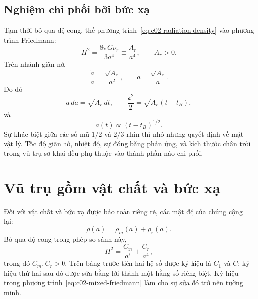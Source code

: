 \begin{classroomqa}
\end{classroomqa}

\subsection{Nghiệm chi phối bởi bức xạ}

Tạm thời bỏ qua độ cong, thế phương trình~\eqref{eq:c02-radiation-density} vào phương trình Friedmann:
\begin{equation}
H^2=\frac{8\pi G\nu_r}{3a^4}
\equiv\frac{A_r}{a^4},
\qquad A_r>0.
\label{eq:c02-radiation-friedmann}
\end{equation}
Trên nhánh giãn nở,
\begin{equation}
\frac{\dot a}{a}=\frac{\sqrt{A_r}}{a^2},
\qquad
\dot a=\frac{\sqrt{A_r}}{a}.
\end{equation}
Do đó
\begin{equation}
a\,da=\sqrt{A_r}\,dt,
\qquad
\frac{a^2}{2}=\sqrt{A_r}(t-t_B),
\end{equation}
và
\begin{equation}
\boxed{a(t)\propto(t-t_B)^{1/2}.}
\label{eq:c02-radiation-law}
\end{equation}
Sự khác biệt giữa các số mũ \(1/2\) và \(2/3\) nhìn thì nhỏ nhưng quyết định về mặt vật lý. Tốc độ giãn nở, nhiệt độ, sự đóng băng phản ứng, và kích thước chân trời trong vũ trụ sơ khai đều phụ thuộc vào thành phần nào chi phối.

\section{Vũ trụ gồm vật chất và bức xạ}

Đối với vật chất và bức xạ được bảo toàn riêng rẽ, các mật độ của chúng cộng lại:
\begin{equation}
\rho(a)=\rho_m(a)+\rho_r(a).
\end{equation}
Bỏ qua độ cong trong phép so sánh này,
\begin{equation}
\boxed{H^2=\frac{C_m}{a^3}+\frac{C_r}{a^4},}
\label{eq:c02-mixed-friedmann}
\end{equation}
trong đó \(C_m,C_r>0\). Trên bảng trước tiên hai hệ số được ký hiệu là \(C_1\) và \(C\); ký hiệu thứ hai sau đó được sửa bằng lời thành một hằng số riêng biệt. Ký hiệu trong phương trình~\eqref{eq:c02-mixed-friedmann} làm cho sự sửa đó trở nên tường minh.

